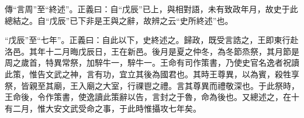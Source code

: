 {\noindent\zhuan{}\fzbyks 傳“言周”至“終述”。正義曰：自“戊辰”已上，與相對語，未有致政年月，故史于此總結之。自“戊辰”已下非是王與之辭，故辨之云“史所終述”也。 \par}

{\noindent\shu{}\fzkt “戊辰”至“七年”。正義曰：自此以下，史終述之。歸政，既受言誥之，王即東行赴洛邑。其年十二月晦戊辰日，王在新邑。後月是夏之仲冬，為冬節烝祭，其月節是周之歲首，特異常祭，加騂牛一，騂牛一。王命有司作策書，乃使史官名逸者祝讀此策，惟告文武之神，言有功，宜立其後為國君也。其時王尊異，以為賓，殺牲享祭，皆親至其廟，王入廟之大室，行祼鬯之禮。言其尊異而禮敬深也。于此祭時，王命後，令作策書，使逸讀此策辭以告，言封之于魯，命為後也。又總述之，在十有二月，惟大安文武受命之事，于此時惟攝攻七年矣。 \par}

